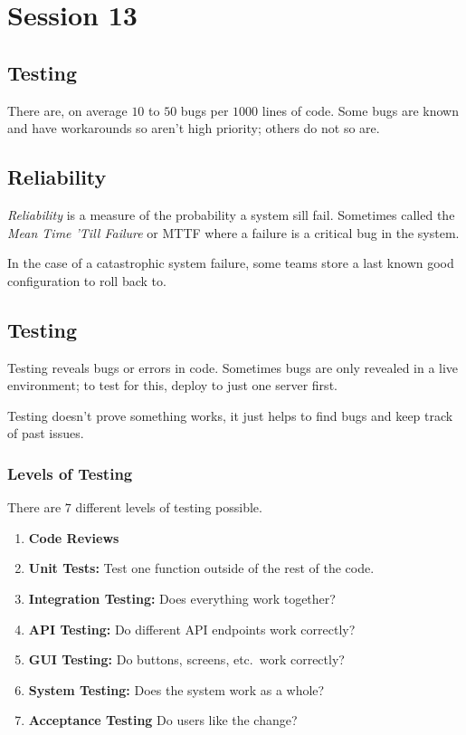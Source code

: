 \section{Session 13}\label{sec:session_13_one}

\subsection{Testing}\label{sub:testing}

There are, on average \(10\) to \(50\) bugs per \(1000\) lines of code.
Some bugs are known and have workarounds so aren't high priority; others do not so are.

\subsection{Reliability}\label{ssub:reliability}

\emph{Reliability} is a measure of the probability a system sill fail.
Sometimes called the \emph{Mean Time 'Till Failure} or MTTF where a failure is a critical bug in the system.

In the case of a catastrophic system failure, some teams store a last known good configuration to roll back to.

\subsection{Testing}\label{ssub:testing}

Testing reveals bugs or errors in code.
Sometimes bugs are only revealed in a live environment; to test for this, deploy to just one server first.

\begin{note}
    Testing doesn't prove something works, it just helps to find bugs and keep track of past issues.
\end{note}

\subsubsection{Levels of Testing}\label{ssub:levels_of_testing}

There are \(7\) different levels of testing possible.

\begin{enumerate}
    \item \textbf{Code Reviews}
    \item \textbf{Unit Tests:} Test one function outside of the rest of the code.
    \item \textbf{Integration Testing:} Does everything work together?
    \item \textbf{API Testing:} Do different API endpoints work correctly?
    \item \textbf{GUI Testing:} Do buttons, screens, etc.\ work correctly?
    \item \textbf{System Testing:} Does the system work as a whole?
    \item \textbf{Acceptance Testing} Do users like the change?
\end{enumerate}

